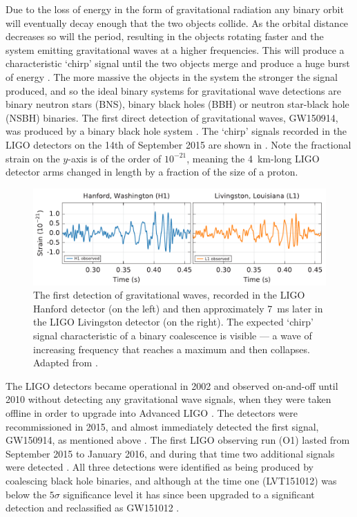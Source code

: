 \begin{colsection}
\begin{colsection}
Due to the loss of energy in the form of gravitational radiation any binary orbit will eventually decay enough that the two objects collide. As the orbital distance decreases so will the period, resulting in the objects rotating faster and the system emitting gravitational waves at a higher frequencies. This will produce a characteristic `chirp' signal until the two objects merge and produce a huge burst of energy \citep{GW_sources, BIGparis}. The more massive the objects in the system the stronger the signal produced, and so the ideal binary systems for gravitational wave detections are binary neutron stars (BNS), binary black holes (BBH) or neutron star-black hole (NSBH) binaries. The first direct detection of gravitational waves, GW150914, was produced by a binary black hole system \citep{GW150914}. The `chirp' signals recorded in the LIGO detectors on the 14th of September 2015 are shown in . Note the fractional strain on the $y$-axis is of the order of $10^{-21}$, meaning the \SI{4}{\kilo\metre}-long LIGO detector arms changed in length by a fraction of the size of a proton.

\begin{figure}[t]
    \begin{center}
        \includegraphics[width=\linewidth]{images/chirp.pdf}
    \end{center}
    \caption[The first detection of gravitational waves]{
        The first detection of gravitational waves, recorded in the LIGO Hanford detector (on the left) and then approximately \SI{7}{\milli\second} later in the LIGO Livingston detector (on the right). The expected `chirp' signal characteristic of a binary coalescence is visible --- a wave of increasing frequency that reaches a maximum and then collapses. Adapted from \citet{GW150914}.
        }\label{fig:chirp}
\end{figure}

The LIGO detectors became operational in 2002 and observed on-and-off until 2010 without detecting any gravitational wave signals, when they were taken offline in order to upgrade into Advanced LIGO \citep{LIGO_initial, LIGO_advanced}. The detectors were recommissioned in 2015, and almost immediately detected the first signal, GW150914, as mentioned above \citep{GW150914}. The first LIGO observing run (O1)  lasted from September 2015 to January 2016, and during that time two additional signals were detected \citep{LIGO_O1}. All three detections were identified as being produced by coalescing black hole binaries, and although at the time one (LVT151012) was below the $5\sigma$ significance level it has since been upgraded to a significant detection and reclassified as GW151012 \citep{GW_catalog}.


\end{colsection}
\end{colsection}
